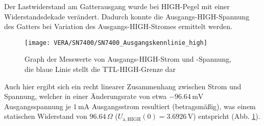Der Lastwiderstand am Gatterausgang wurde bei HIGH-Pegel mit einer
Widerstandsdekade verändert. Dadurch konnte die Ausgangs-HIGH-Spannung des
Gatters bei Variation des Ausgangs-HIGH-Stromes ermittelt werden.

\begin{figure}[h]
  \begin{center}
    \texttt{[image: VERA/SN7400/SN7400\_Ausgangskennlinie\_high]}
  \end{center}
  \caption{Graph der Messwerte von Ausgangs-HIGH-Strom und -Spannung, die blaue
    Linie stellt die TTL-HIGH-Grenze dar}
  \label{fig:aus_schnib_high}
\end{figure}


Auch hier
ergibt sich ein recht linearer Zusammenhang zwischen Strom und Spannung, welcher
in einer Änderungsrate von etwa $- 96.64 \, \si{\milli\volt}$ Ausgangsspannung
je $1 \, \si{\milli\ampere}$ Ausgangsstrom resultiert (betragsmäßig), was einem
statischen Widerstand von $96.64 \, \Omega$ ($U_\mathrm{a,HIGH}(0) = 3.6926 \, \si{\volt}$) entspricht (Abb. \ref{fig:aus_schnib_high}).

